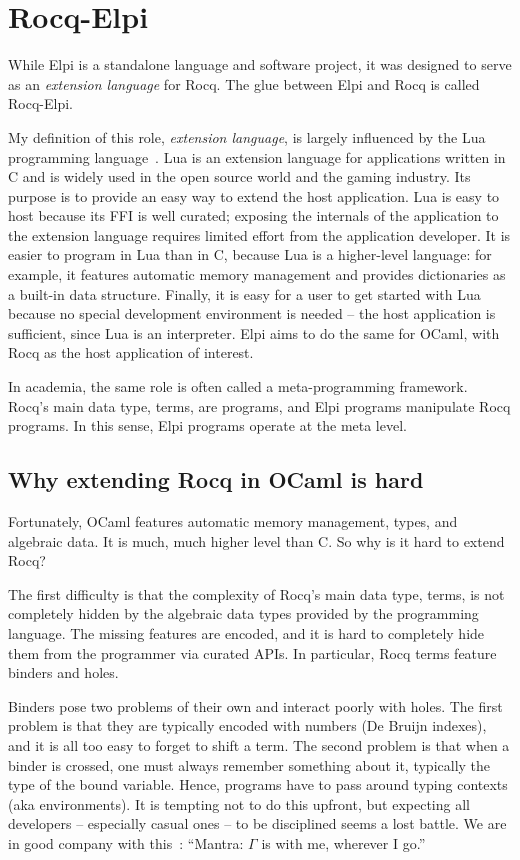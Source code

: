 \documentclass[a4paper, 11pt]{book}
\begin{document}
\chapter{Rocq-Elpi}\label{sec:rocq}


While Elpi is a standalone language and software project, it was designed to
serve as an \emph{extension language} for Rocq. The glue between Elpi and Rocq
is called Rocq-Elpi.

My definition of this role, \emph{extension language}, is largely influenced by
the Lua programming language~\cite{10.5555/1200583}. Lua is an extension
language for applications written in C and is widely used in the open source
world and the gaming industry. Its purpose is to provide an easy way to extend
the host application. Lua is easy to host because its FFI is well curated;
exposing the internals of the application to the extension language requires
limited effort from the application developer. It is easier to program in Lua
than in C, because Lua is a higher-level language: for example, it features
automatic memory management and provides dictionaries as a built-in data
structure. Finally, it is easy for a user to get started with Lua because no
special development environment is needed -- the host application is sufficient,
since Lua is an interpreter.
Elpi aims to do the same for OCaml, with Rocq as the host application of
interest.

In academia, the same role is often called a meta-programming framework. Rocq's
main data type, terms, are programs, and Elpi programs manipulate Rocq
programs. In this sense, Elpi programs operate at the meta level.


\section{Why extending Rocq in OCaml is hard}

Fortunately, OCaml features automatic memory management, types, and algebraic
data. It is much, much higher level than C. So why is it hard to extend Rocq?

The first difficulty is that the complexity of Rocq's main data type, terms,
is not completely hidden by the algebraic data types provided by the
programming language. The missing features are encoded, and it is hard to
completely hide them from the programmer via curated APIs. In particular,
Rocq terms feature binders and holes.

Binders pose two problems of their own and interact poorly with holes. The
first problem is that they are typically encoded with numbers (De Bruijn
indexes), and it is all too easy to forget to shift a term. The second
problem is that when a binder is crossed, one must always remember something
about it, typically the type of the bound variable. Hence, programs have to
pass around typing contexts (aka environments). It is tempting not to do this
upfront, but expecting all developers -- especially casual ones -- to be disciplined
seems a lost battle. We are in good company with this~\cite[page 20]{mcbride}:
``Mantra: $\Gamma$ is with me, wherever I go.''
\end{document}
